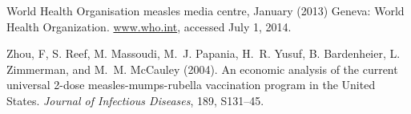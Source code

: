 \documentclass{article}
\begin{document}
\begin{thebibliography}{}
World Health Organisation measles media centre, January (2013)
\newblock Geneva: World Health Organization.
\href{http://www.who.int/mediacentre/news/notes/2013/measles_20130117/en/}{www.who.int}, accessed July 1, 2014.

Zhou, F, S. Reef, M. Massoudi, M.~J. Papania, H.~R. Yusuf, B. Bardenheier, L. Zimmerman, and M.~M. McCauley (2004).
\newblock An economic analysis of the current universal 2-dose measles-mumps-rubella vaccination program in the United States.
\newblock \emph{Journal of Infectious Diseases}, 189, S131--45.

\end{thebibliography}
\end{document}
